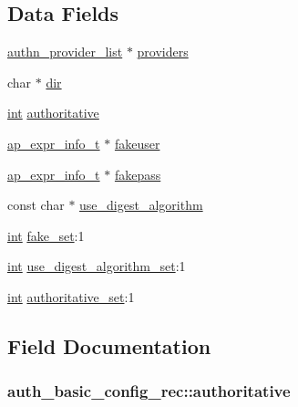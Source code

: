 \subsection*{Data Fields}
\begin{DoxyCompactItemize}
\item 
\hyperlink{structauthn__provider__list}{authn\+\_\+provider\+\_\+list} $\ast$ \hyperlink{structauth__basic__config__rec_a143819877a61d8e772d08cc033ec81be}{providers}
\item 
char $\ast$ \hyperlink{structauth__basic__config__rec_a84aa97687033dbe42b5fed39c6becc93}{dir}
\item 
\hyperlink{pcre_8txt_a42dfa4ff673c82d8efe7144098fbc198}{int} \hyperlink{structauth__basic__config__rec_ac1e55bee9b4b1f24f7bbda3f42b98796}{authoritative}
\item 
\hyperlink{structap__expr__info__t}{ap\+\_\+expr\+\_\+info\+\_\+t} $\ast$ \hyperlink{structauth__basic__config__rec_a451437c491dc890f7dca8dca3659e738}{fakeuser}
\item 
\hyperlink{structap__expr__info__t}{ap\+\_\+expr\+\_\+info\+\_\+t} $\ast$ \hyperlink{structauth__basic__config__rec_a70b8fbae158ce1ed067e9ccebef1873d}{fakepass}
\item 
const char $\ast$ \hyperlink{structauth__basic__config__rec_a7f30397d931d68436df1e63d511cdfc2}{use\+\_\+digest\+\_\+algorithm}
\item 
\hyperlink{pcre_8txt_a42dfa4ff673c82d8efe7144098fbc198}{int} \hyperlink{structauth__basic__config__rec_a7e51f3dc5c64337ad57e92194944645c}{fake\+\_\+set}\+:1
\item 
\hyperlink{pcre_8txt_a42dfa4ff673c82d8efe7144098fbc198}{int} \hyperlink{structauth__basic__config__rec_aec014132565fd16aa0c667da77373c7f}{use\+\_\+digest\+\_\+algorithm\+\_\+set}\+:1
\item 
\hyperlink{pcre_8txt_a42dfa4ff673c82d8efe7144098fbc198}{int} \hyperlink{structauth__basic__config__rec_a87cda24b7163f55c4cf9531358fc5fed}{authoritative\+\_\+set}\+:1
\end{DoxyCompactItemize}


\subsection{Field Documentation}
\subsubsection[{\texorpdfstring{authoritative}{authoritative}}]{ auth\+\_\+basic\+\_\+config\+\_\+rec\+::authoritative}\hypertarget{structauth__basic__config__rec_ac1e55bee9b4b1f24f7bbda3f42b98796}{}\label{structauth__basic__config__rec_ac1e55bee9b4b1f24f7bbda3f42b98796}
